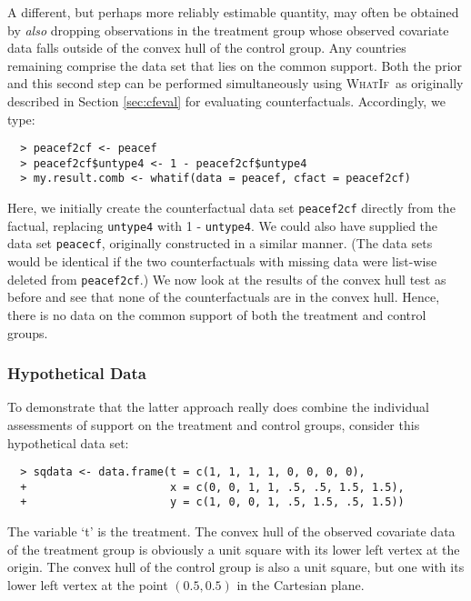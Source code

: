 \documentclass[oneside,letterpaper,titlepage]{article}
\newcommand{\WhatIf}{\textsc{WhatIf}}
\begin{document}
A different, but perhaps more reliably estimable quantity, may often
be obtained by \emph{also} dropping observations in the treatment
group whose observed covariate data falls outside of the convex hull
of the control group.  Any countries remaining comprise the data set
that lies on the common support.  Both the prior and this second step
can be performed simultaneously using \WhatIf\ as originally described
in Section \ref{sec:cfeval} for evaluating counterfactuals.
Accordingly, we type:
  \begin{verbatim}
  > peacef2cf <- peacef
  > peacef2cf$untype4 <- 1 - peacef2cf$untype4
  > my.result.comb <- whatif(data = peacef, cfact = peacef2cf)
  \end{verbatim}
Here, we initially create the counterfactual data set
\texttt{peacef2cf} directly from the factual, replacing
\texttt{untype4} with 1 - \texttt{untype4}.  We could also have
supplied the data set \texttt{peacecf}, originally constructed in a
similar manner.  (The data sets would be identical if the two
counterfactuals with missing data were list-wise deleted from
\texttt{peacef2cf}.)  We now look at the results of the convex hull
test as before and see that none of the counterfactuals are in the
convex hull.  Hence, there is no data on the common support of both
the treatment and control groups.

\subsubsection{Hypothetical Data}

To demonstrate that the latter approach really does combine the
individual assessments of support on the treatment and control groups,
consider this hypothetical data set:
  \begin{verbatim}
  > sqdata <- data.frame(t = c(1, 1, 1, 1, 0, 0, 0, 0), 
  +                      x = c(0, 0, 1, 1, .5, .5, 1.5, 1.5), 
  +                      y = c(1, 0, 0, 1, .5, 1.5, .5, 1.5))
  \end{verbatim}
The variable `t' is the treatment.  The convex hull of the observed
covariate data of the treatment group is obviously a unit square with
its lower left vertex at the origin.  The convex hull of the control
group is also a unit square, but one with its lower left vertex at the
point $(0.5, 0.5)$ in the Cartesian plane.
\end{document}
